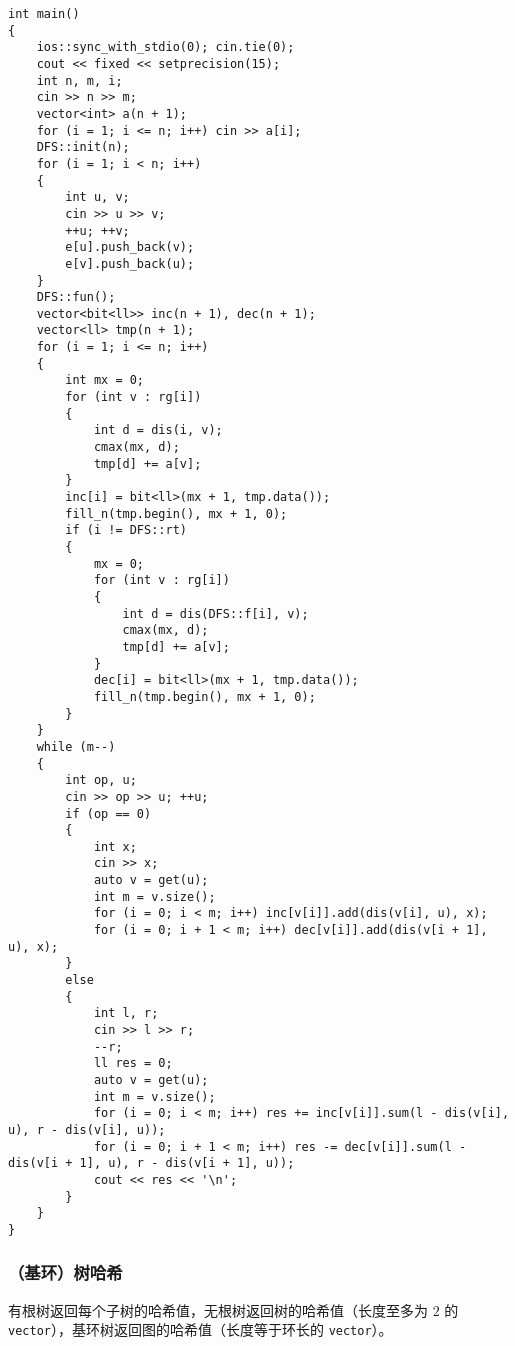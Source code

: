 \documentclass[12pt]{ctexart}
\begin{document}
\begin{lstlisting}
int main()
{
	ios::sync_with_stdio(0); cin.tie(0);
	cout << fixed << setprecision(15);
	int n, m, i;
	cin >> n >> m;
	vector<int> a(n + 1);
	for (i = 1; i <= n; i++) cin >> a[i];
	DFS::init(n);
	for (i = 1; i < n; i++)
	{
		int u, v;
		cin >> u >> v;
		++u; ++v;
		e[u].push_back(v);
		e[v].push_back(u);
	}
	DFS::fun();
	vector<bit<ll>> inc(n + 1), dec(n + 1);
	vector<ll> tmp(n + 1);
	for (i = 1; i <= n; i++)
	{
		int mx = 0;
		for (int v : rg[i])
		{
			int d = dis(i, v);
			cmax(mx, d);
			tmp[d] += a[v];
		}
		inc[i] = bit<ll>(mx + 1, tmp.data());
		fill_n(tmp.begin(), mx + 1, 0);
		if (i != DFS::rt)
		{
			mx = 0;
			for (int v : rg[i])
			{
				int d = dis(DFS::f[i], v);
				cmax(mx, d);
				tmp[d] += a[v];
			}
			dec[i] = bit<ll>(mx + 1, tmp.data());
			fill_n(tmp.begin(), mx + 1, 0);
		}
	}
	while (m--)
	{
		int op, u;
		cin >> op >> u; ++u;
		if (op == 0)
		{
			int x;
			cin >> x;
			auto v = get(u);
			int m = v.size();
			for (i = 0; i < m; i++) inc[v[i]].add(dis(v[i], u), x);
			for (i = 0; i + 1 < m; i++) dec[v[i]].add(dis(v[i + 1], u), x);
		}
		else
		{
			int l, r;
			cin >> l >> r;
			--r;
			ll res = 0;
			auto v = get(u);
			int m = v.size();
			for (i = 0; i < m; i++) res += inc[v[i]].sum(l - dis(v[i], u), r - dis(v[i], u));
			for (i = 0; i + 1 < m; i++) res -= dec[v[i]].sum(l - dis(v[i + 1], u), r - dis(v[i + 1], u));
			cout << res << '\n';
		}
	}
}
\end{lstlisting}

\subsubsection{（基环）树哈希}

有根树返回每个子树的哈希值，无根树返回树的哈希值（长度至多为 $2$ 的 \verb|vector|），基环树返回图的哈希值（长度等于环长的 \verb|vector|）。
\end{document}
